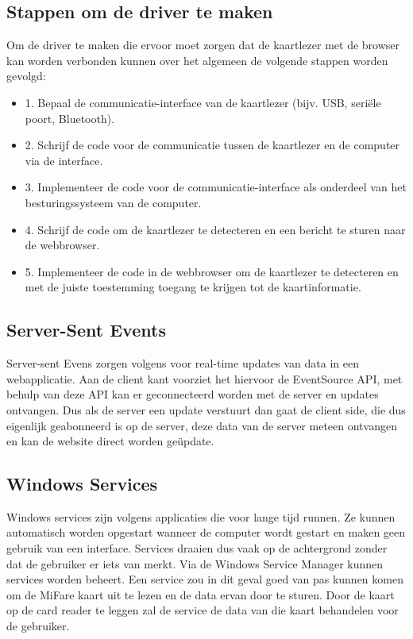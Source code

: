 \subsection{Stappen om de driver te maken}
Om de driver te maken die ervoor moet zorgen dat de kaartlezer met de browser kan worden verbonden kunnen over het algemeen de volgende stappen worden gevolgd:
\begin{itemize}
    \item 1. Bepaal de communicatie-interface van de kaartlezer (bijv. USB, seriële poort, Bluetooth).
    \item 2. Schrijf de code voor de communicatie tussen de kaartlezer en de computer via de interface.
    \item 3. Implementeer de code voor de communicatie-interface als onderdeel van het besturingssysteem van de computer.
    \item 4. Schrijf de code om de kaartlezer te detecteren en een bericht te sturen naar de webbrowser.
    \item 5. Implementeer de code in de webbrowser om de kaartlezer te detecteren en met de juiste toestemming toegang te krijgen tot de kaartinformatie.
\end{itemize}

\subsection{Server-Sent Events}
Server-sent Evens zorgen volgens \textcite{DigitalOceanSSE} voor real-time updates van data in een webapplicatie. Aan de client kant voorziet het hiervoor de EventSource API, met behulp van deze API kan er geconnecteerd worden met de server en updates ontvangen. Dus als de server een update verstuurt dan gaat de client side, die dus eigenlijk geabonneerd is op de server, deze data van de server meteen ontvangen en kan de website direct worden geüpdate.

\subsection{Windows Services}
Windows services zijn volgens \textcite{MicrosoftWS} applicaties die voor lange tijd runnen. Ze kunnen automatisch worden opgestart wanneer de computer wordt gestart en maken geen gebruik van een interface. Services draaien dus vaak op de achtergrond zonder dat de gebruiker er iets van merkt. Via de Windows Service Manager kunnen services worden beheert. Een service zou in dit geval goed van pas kunnen komen om de MiFare kaart uit te lezen en de data ervan door te sturen. Door de kaart op de card reader te leggen zal de service de data van die kaart behandelen voor de gebruiker.


